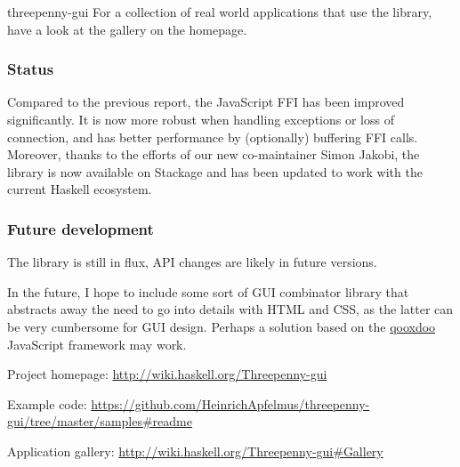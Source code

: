 \begin{hcarentry}[updated]{threepenny-gui}
For a collection of real world applications that use the library, have a look
at the gallery on the homepage.

\subsubsection*{Status}

Compared to the previous report, the JavaScript FFI has been improved significantly. It is now more robust when handling exceptions or loss of connection, and has better performance by (optionally) buffering FFI calls. Moreover, thanks to the efforts of our new co-maintainer Simon Jakobi, the library is now available on Stackage and has been updated to work with the current Haskell ecosystem.

\subsubsection*{Future development}

The library is still in flux, API changes are likely in future versions.

In the future, I hope to include some sort of GUI combinator library that abstracts away the need to go into details with HTML and CSS, as the latter can be very cumbersome for GUI design. Perhaps a solution based on the \href{http://www.qooxdoo.org}{qooxdoo} JavaScript framework may work.

\FurtherReading
\begin{compactitem}
\item Project homepage: \url{http://wiki.haskell.org/Threepenny-gui}
\item Example code:
  \url{https://github.com/HeinrichApfelmus/threepenny-gui/tree/master/samples#readme}
\item Application gallery: \url{http://wiki.haskell.org/Threepenny-gui#Gallery}
\end{compactitem}
\end{hcarentry}

